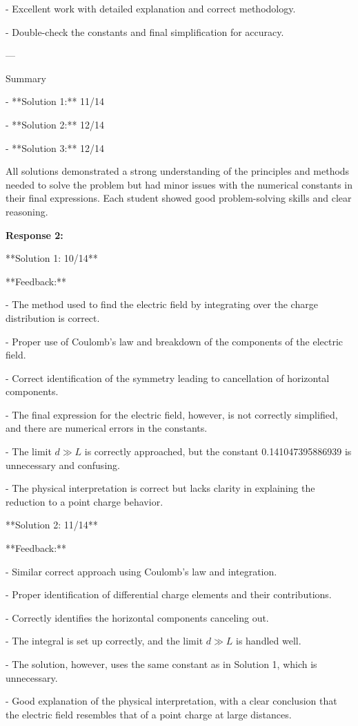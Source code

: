 \documentclass[a4paper,11pt]{article}
\begin{document}
- Excellent work with detailed explanation and correct methodology.

- Double-check the constants and final simplification for accuracy.

---

Summary

- **Solution 1:** 11/14

- **Solution 2:** 12/14

- **Solution 3:** 12/14

All solutions demonstrated a strong understanding of the principles and methods needed to solve the problem but had minor issues with the numerical constants in their final expressions. Each student showed good problem-solving skills and clear reasoning.

\bigskip
\textbf{Response 2:}

**Solution 1: 10/14**

**Feedback:**

- The method used to find the electric field by integrating over the charge distribution is correct.

- Proper use of Coulomb's law and breakdown of the components of the electric field.

- Correct identification of the symmetry leading to cancellation of horizontal components.

- The final expression for the electric field, however, is not correctly simplified, and there are numerical errors in the constants.

- The limit \( d \gg L \) is correctly approached, but the constant 0.141047395886939 is unnecessary and confusing.

- The physical interpretation is correct but lacks clarity in explaining the reduction to a point charge behavior.

**Solution 2: 11/14**

**Feedback:**

- Similar correct approach using Coulomb's law and integration.

- Proper identification of differential charge elements and their contributions.

- Correctly identifies the horizontal components canceling out.

- The integral is set up correctly, and the limit \( d \gg L \) is handled well.

- The solution, however, uses the same constant as in Solution 1, which is unnecessary.

- Good explanation of the physical interpretation, with a clear conclusion that the electric field resembles that of a point charge at large distances.
\end{document}
